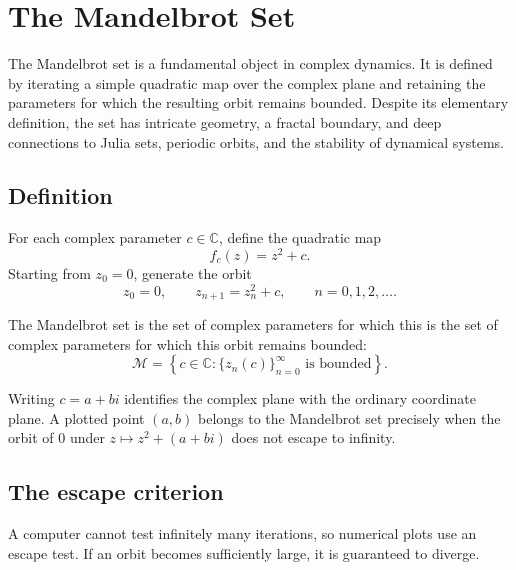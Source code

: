 \documentclass[a4paper, 10pt, onepage]{elegantbook}
\begin{document}
{\section{The Mandelbrot Set}

\noindent

The Mandelbrot set is a fundamental object in complex dynamics. It is
defined by iterating a simple quadratic map over the complex plane and
retaining the parameters for which the resulting orbit remains
bounded. Despite its elementary definition, the set has intricate
geometry, a fractal boundary, and deep connections to Julia sets,
periodic orbits, and the stability of dynamical systems.

\subsection{Definition}

\noindent

For each complex parameter $c\in\mathbb{C}$, define the quadratic map
\begin{equation}
  f_c(z)=z^2+c.
\end{equation}
Starting from $z_0=0$, generate the orbit
\begin{equation}
  z_0=0,\qquad z_{n+1}=z_n^2+c,\qquad n=0,1,2,\ldots.
\end{equation}

\begin{definition}
The Mandelbrot set is the set of complex parameters for which 
this is the set of complex parameters for which this
orbit remains bounded:
\begin{equation}
  \mathcal{M}
  =
  \left\{c\in\mathbb{C}:
  \bigl\{z_n(c)\bigr\}_{n=0}^{\infty}
  \text{ is bounded}\right\}.
\end{equation}
\end{definition}

Writing $c=a+bi$ identifies the complex plane with the ordinary
coordinate plane. A plotted point $(a,b)$ belongs to the Mandelbrot
set precisely when the orbit of $0$ under $z\mapsto z^2+(a+bi)$ does
not escape to infinity.

\subsection{The escape criterion}

\noindent

A computer cannot test infinitely many iterations, so numerical plots
use an escape test. If an orbit becomes sufficiently large, it is
guaranteed to diverge.

}
\end{document}
